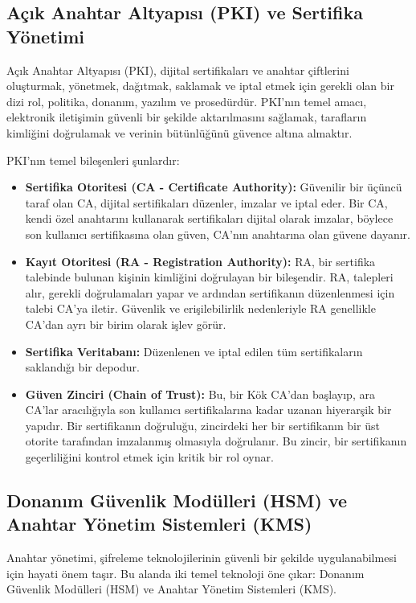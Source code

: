 \subsection{Açık Anahtar Altyapısı (PKI) ve Sertifika Yönetimi}

Açık Anahtar Altyapısı (PKI), dijital sertifikaları ve anahtar çiftlerini oluşturmak, yönetmek, dağıtmak, saklamak ve iptal etmek için gerekli olan bir dizi rol, politika, donanım, yazılım ve prosedürdür. PKI'nın temel amacı, elektronik iletişimin güvenli bir şekilde aktarılmasını sağlamak, tarafların kimliğini doğrulamak ve verinin bütünlüğünü güvence altına almaktır.

PKI'nın temel bileşenleri şunlardır:

\begin{itemize}
    \item \textbf{Sertifika Otoritesi (CA - Certificate Authority):} Güvenilir bir üçüncü taraf olan CA, dijital sertifikaları düzenler, imzalar ve iptal eder. Bir CA, kendi özel anahtarını kullanarak sertifikaları dijital olarak imzalar, böylece son kullanıcı sertifikasına olan güven, CA'nın anahtarına olan güvene dayanır.
    \item \textbf{Kayıt Otoritesi (RA - Registration Authority):} RA, bir sertifika talebinde bulunan kişinin kimliğini doğrulayan bir bileşendir. RA, talepleri alır, gerekli doğrulamaları yapar ve ardından sertifikanın düzenlenmesi için talebi CA'ya iletir. Güvenlik ve erişilebilirlik nedenleriyle RA genellikle CA'dan ayrı bir birim olarak işlev görür.
    \item \textbf{Sertifika Veritabanı:} Düzenlenen ve iptal edilen tüm sertifikaların saklandığı bir depodur.
    \item \textbf{Güven Zinciri (Chain of Trust):} Bu, bir Kök CA'dan başlayıp, ara CA'lar aracılığıyla son kullanıcı sertifikalarına kadar uzanan hiyerarşik bir yapıdır. Bir sertifikanın doğruluğu, zincirdeki her bir sertifikanın bir üst otorite tarafından imzalanmış olmasıyla doğrulanır. Bu zincir, bir sertifikanın geçerliliğini kontrol etmek için kritik bir rol oynar.
\end{itemize}

\subsection{Donanım Güvenlik Modülleri (HSM) ve Anahtar Yönetim Sistemleri (KMS)}

Anahtar yönetimi, şifreleme teknolojilerinin güvenli bir şekilde uygulanabilmesi için hayati önem taşır. Bu alanda iki temel teknoloji öne çıkar: Donanım Güvenlik Modülleri (HSM) ve Anahtar Yönetim Sistemleri (KMS).

